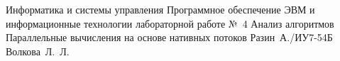 \documentclass{bmstu}[a4paper]
\begin{document}
	
	\makereporttitle
	{Информатика и системы управления} %
	{Программное обеспечение ЭВМ и информационные технологии} %
	{лабораторной работе №~4} %
	{Анализ алгоритмов} %
	{Параллельные вычисления на основе нативных потоков} %
	{} %
	{Разин~А./ИУ7-54Б} %
	{Волкова~Л.~Л.} %
	
	\maketableofcontents
	
	
	
	
	
	
	
	
	
	\makebibliography
	
	
	
	
\end{document}
